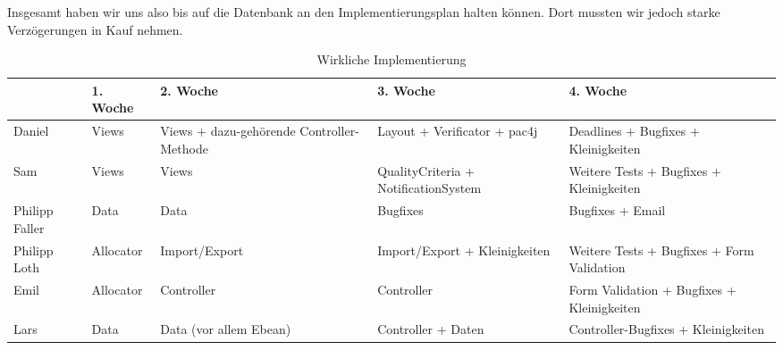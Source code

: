 \documentclass[parskip=full]{scrartcl}
\begin{document}
Insgesamt haben wir uns also bis auf die Datenbank an den Implementierungsplan halten können. Dort mussten wir jedoch starke Verzögerungen in Kauf nehmen.




\begin{table}[H]
\begin{tabularx}{\textwidth}{|l|l|X|X|X|}
\hline
 	& 1. Woche			& 2. Woche		& 3. Woche & 4. Woche\\
\hline 
Daniel	& Views			& Views + dazu-gehörende Controller-Methode & Layout + Verificator
+ pac4j&Deadlines + Bugfixes +
Kleinigkeiten \\
\hline
Sam & Views&Views& QualityCriteria +
NotificationSystem & Weitere Tests +
Bugfixes +
Kleinigkeiten\\
\hline
Philipp Faller&Data&Data&Bugfixes&Bugfixes +  Email\\
\hline
Philipp Loth&Allocator&Import/Export
&Import/Export + Kleinigkeiten &Weitere Tests +
Bugfixes +
Form Validation\\
\hline
Emil&Allocator&Controller&Controller&Form Validation +
Bugfixes +
Kleinigkeiten\\
\hline
Lars&Data&Data (vor allem
Ebean)&Controller + Daten &
Controller-Bugfixes +
Kleinigkeiten\\
\hline
\end{tabularx}
\caption{Wirkliche Implementierung}
\end{table}
\end{document}
